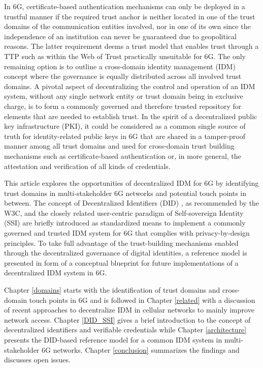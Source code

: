 \documentclass[conference]{IEEEtran}
\begin{document}
In 6G, certificate-based authentication mechanisms can only be deployed in a trustful manner if the required trust anchor is neither located in one of the trust domains of the communication entities involved, nor in one of its own since the independence of an institution can never be guaranteed due to geopolitical reasons. The latter requirement deems a trust model that enables trust through a TTP such as within the Web of Trust practically unsuitable for 6G. The only remaining option is to outline a cross-domain identity management (IDM) concept where the governance is equally distributed across all involved trust domains. A pivotal aspect of decentralizing the control and operation of an IDM system, without any single network entity or trust domain being in exclusive charge, is to form a commonly governed and therefore trusted repository for elements that are needed to establish trust. In the spirit of a decentralized public key infrastructure (PKI), it could be considered as a common single source of truth for identity-related public keys in 6G that are shared in a tamper-proof manner among all trust domains and used for cross-domain trust building mechanisms such as certificate-based authentication or, in more general, the attestation and verification of all kinds of credentials.    

This article explores the opportunities of decentralized IDM for 6G by identifying trust domains in multi-stakeholder 6G networks and potential touch points in between. The concept of Decentralized Identifiers (DID) \cite{WorldWideWebConsortium.822021}, as recommended by the W3C, and the closely related user-centric paradigm of Self-sovereign Identity (SSI) \cite{Toth.2019} are briefly introduced as standardized means to implement a commonly governed and trusted IDM system for 6G that complies with privacy-by-design principles. To take full advantage of the trust-building mechanisms enabled through the decentralized governance of digital identities, a reference model is presented in form of a conceptual blueprint for future implementations of a decentralized IDM system in 6G. 

Chapter {\ref{domains}} starts with the identification of trust domains and cross-domain touch points in 6G and is followed in Chapter {\ref{related}} with a discussion of recent approaches to decentralize IDM in cellular networks to mainly improve network access. Chapter \ref{DID_SSI} gives a brief introduction to the concept of decentralized identifiers and verifiable credentials while Chapter \ref{architecture} presents the DID-based reference model for a common IDM system in multi-stakeholder 6G networks. Chapter \ref{conclusion} summarizes the findings and discusses open issues.     
\end{document}
